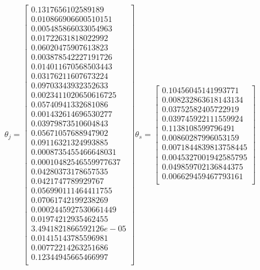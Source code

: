 \documentclass[a4paper]{article}
\theoremstyle{definition}
\newenvironment{soln}{
    \leavevmode\color{blue}\ignorespaces
}{}
\begin{document}
\begin{enumerate}
\begin{soln}
	$$\theta_j = \begin{bmatrix}
		0.1317656102589189\\
		0.010866906600510151\\
		0.005485866033054963\\
		0.01722631818022992\\
		0.06020475907613823\\
		0.003878542227191726\\
		0.014011670568503443\\
		0.03176211607673224\\
		0.09703343932352633\\
		0.0023411020650616725\\
		0.05740941332681086\\
		0.001432614696530277\\
		0.03979873510604843\\
		0.05671057688947902\\
		0.09116321324993885\\
		0.0008735455466648031\\
		0.00010482546559977637\\
		0.04280373178657535\\
		0.0421747789929767\\
		0.056990111464411755\\
		0.07061742199238269\\
		0.0002445927530661449\\
		0.01974212935462455\\
		3.4941821866592126e-05\\
		0.01415143785596981\\
		0.00772214263251686\\
		0.12344945665466997\\
	\end{bmatrix}
	\theta_s = \begin{bmatrix}
		0.10456045141993771\\
		0.008232863618143134\\
		0.03752582405722919\\
		0.039745922111559924\\
		0.1138108599796491\\
		0.00860287996053159\\
		0.0071844839813758445\\
		0.0045327001942585795\\
		0.049859702136844375\\
		0.006629459467793161\\

\end{bmatrix}$$
\end{soln}
\end{enumerate}
\end{document}
